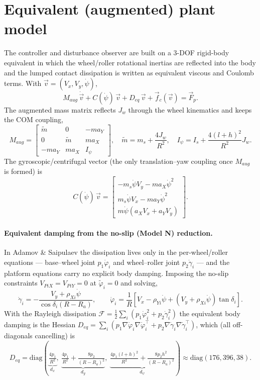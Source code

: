 \documentclass[11pt]{article}
\newcommand{\half}{\tfrac12}
\begin{document}
\section{Equivalent (augmented) plant model}
The controller and disturbance observer are built on a 3-DOF rigid-body equivalent in which
the wheel/roller rotational inertias are reflected into the body and the lumped contact
dissipation is written as equivalent viscous and Coulomb terms. With $\vec v=(V_x,V_y,\dot\psi)$,
\begin{equation}
M_{aug}\,\dot{\vec v}+C(\dot\psi)\,\vec v+D_{eq}\,\vec v+\vec f_c(\vec v)=\vec F_p .
\label{eq:plant}
\end{equation}
The augmented mass matrix reflects $J_w$ through the wheel kinematics and keeps the COM coupling,
\begin{equation}
M_{aug}=\begin{bmatrix}\tilde m&0&-ma_Y\\0&\tilde m&ma_X\\-ma_Y&ma_X&I_\psi\end{bmatrix},\quad
\tilde m=m_s+\frac{4J_w}{R^2},\quad I_\psi=I_s+\frac{4(l+h)^2}{R^2}J_w .
\label{eq:Maug}
\end{equation}
The gyroscopic/centrifugal vector (the only translation--yaw coupling once $M_{aug}$ is formed) is
\begin{equation}
C(\dot\psi)\,\vec v=\begin{bmatrix}
-m_s\dot\psi V_y-ma_X\dot\psi^2\\
m_s\dot\psi V_x-ma_Y\dot\psi^2\\
m\dot\psi(a_XV_x+a_YV_y)\end{bmatrix}.
\label{eq:Cv}
\end{equation}

\paragraph{Equivalent damping from the no-slip (Model N) reduction.} In Adamov \& Saipulaev the
dissipation lives only in the per-wheel/roller equations --- base--wheel joint $p_1\dot\varphi_i$
and wheel--roller joint $p_2\dot\gamma_i$ --- and the platform equations carry no explicit body
damping. Imposing the no-slip constraints $V_{PiX}=V_{PiY}=0$ at $\tilde\varphi_i=0$ and solving,
\begin{equation}
\dot\gamma_i=-\frac{V_y+\rho_{Xi}\dot\psi}{\cos\delta_i(R-R_a)},\qquad
\dot\varphi_i=\frac{1}{R}\!\left[V_x-\rho_{Yi}\dot\psi+(V_y+\rho_{Xi}\dot\psi)\tan\delta_i\right].
\label{eq:noslip}
\end{equation}
With the Rayleigh dissipation $\mathcal F=\half\sum_i(p_1\dot\varphi_i^2+p_2\dot\gamma_i^2)$ the
equivalent body damping is the Hessian
$D_{eq}=\sum_i(p_1\nabla\dot\varphi_i\nabla\dot\varphi_i^\top+p_2\nabla\dot\gamma_i\nabla\dot\gamma_i^\top)$,
which (all off-diagonals cancelling) is
\begin{equation}
D_{eq}=\mathrm{diag}\!\left(\underbrace{\tfrac{4p_1}{R^2}}_{d_x},\
\underbrace{\tfrac{4p_1}{R^2}+\tfrac{8p_2}{(R-R_a)^2}}_{d_y},\
\underbrace{\tfrac{4p_1(l+h)^2}{R^2}+\tfrac{8p_2h^2}{(R-R_a)^2}}_{d_\psi}\right)\approx\mathrm{diag}(176,396,38).
\end{equation}
\end{document}
